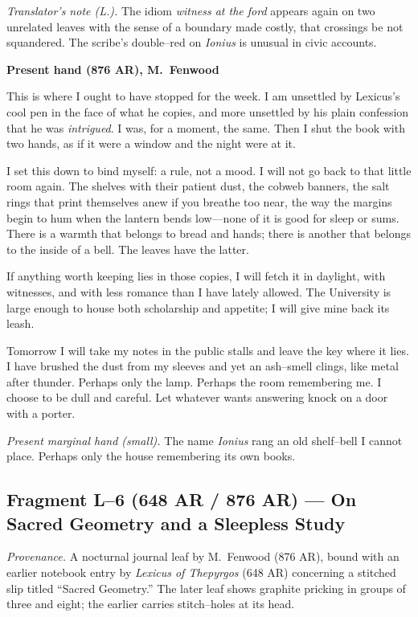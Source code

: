 \documentclass[11pt]{article}
\numberwithin{equation}{section} %
\theoremstyle{plain} %
\theoremstyle{definition} %
\theoremstyle{remark} %
\begin{document}
\medskip
\noindent\textit{Translator’s note (L.).} The idiom \textit{witness at the ford} appears again on two unrelated leaves with the sense of a boundary made costly, that crossings be not squandered. The scribe’s double–red on \emph{Ionius} is unusual in civic accounts.

\medskip
\noindent\textbf{Present hand (876 AR), M.\ Fenwood}

This is where I ought to have stopped for the week. I am unsettled by Lexicus’s cool pen in the face of what he copies, and more unsettled by his plain confession that he was \emph{intrigued}. I was, for a moment, the same. Then I shut the book with two hands, as if it were a window and the night were at it.

I set this down to bind myself: a rule, not a mood. I will not go back to that little room again. The shelves with their patient dust, the cobweb banners, the salt rings that print themselves anew if you breathe too near, the way the margins begin to hum when the lantern bends low—none of it is good for sleep or sums. There is a warmth that belongs to bread and hands; there is another that belongs to the inside of a bell. The leaves have the latter.

If anything worth keeping lies in those copies, I will fetch it in daylight, with witnesses, and with less romance than I have lately allowed. The University is large enough to house both scholarship and appetite; I will give mine back its leash.

Tomorrow I will take my notes in the public stalls and leave the key where it lies. I have brushed the dust from my sleeves and yet an ash–smell clings, like metal after thunder. Perhaps only the lamp. Perhaps the room remembering me. I choose to be dull and careful. Let whatever wants answering knock on a door with a porter.

\medskip
\noindent\textit{Present marginal hand (small).} The name \emph{Ionius} rang an old shelf–bell I cannot place. Perhaps only the house remembering its own books.

\subsection{Fragment L--6 (648 AR / 876 AR) — On Sacred Geometry and a Sleepless Study}
\label{frag:l6}

\noindent\textit{Provenance.} A nocturnal journal leaf by M.\ Fenwood (876 AR), bound with an earlier notebook entry by \textit{Lexicus of Thepyrgos} (648 AR) concerning a stitched slip titled “Sacred Geometry.” The later leaf shows graphite pricking in groups of three and eight; the earlier carries stitch–holes at its head.
\end{document}
